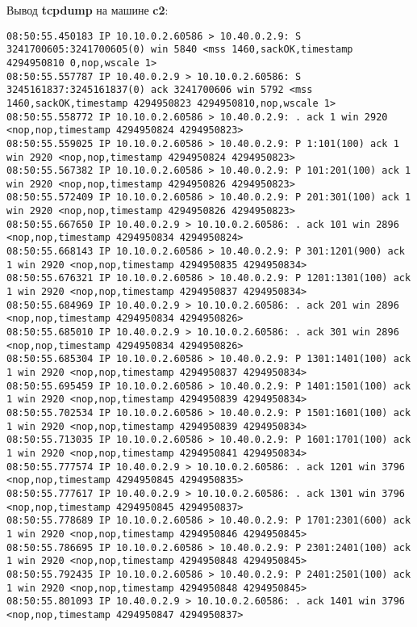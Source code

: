 \documentclass[a4paper,12pt]{article}
\begin{document}
Вывод \textbf{tcpdump} на машине \textbf{c2}:
\begin{Verbatim}
08:50:55.450183 IP 10.10.0.2.60586 > 10.40.0.2.9: S 3241700605:3241700605(0) win 5840 <mss 1460,sackOK,timestamp 4294950810 0,nop,wscale 1>
08:50:55.557787 IP 10.40.0.2.9 > 10.10.0.2.60586: S 3245161837:3245161837(0) ack 3241700606 win 5792 <mss 1460,sackOK,timestamp 4294950823 4294950810,nop,wscale 1>
08:50:55.558772 IP 10.10.0.2.60586 > 10.40.0.2.9: . ack 1 win 2920 <nop,nop,timestamp 4294950824 4294950823>
08:50:55.559025 IP 10.10.0.2.60586 > 10.40.0.2.9: P 1:101(100) ack 1 win 2920 <nop,nop,timestamp 4294950824 4294950823>
08:50:55.567382 IP 10.10.0.2.60586 > 10.40.0.2.9: P 101:201(100) ack 1 win 2920 <nop,nop,timestamp 4294950826 4294950823>
08:50:55.572409 IP 10.10.0.2.60586 > 10.40.0.2.9: P 201:301(100) ack 1 win 2920 <nop,nop,timestamp 4294950826 4294950823>
08:50:55.667650 IP 10.40.0.2.9 > 10.10.0.2.60586: . ack 101 win 2896 <nop,nop,timestamp 4294950834 4294950824>
08:50:55.668143 IP 10.10.0.2.60586 > 10.40.0.2.9: P 301:1201(900) ack 1 win 2920 <nop,nop,timestamp 4294950835 4294950834>
08:50:55.676321 IP 10.10.0.2.60586 > 10.40.0.2.9: P 1201:1301(100) ack 1 win 2920 <nop,nop,timestamp 4294950837 4294950834>
08:50:55.684969 IP 10.40.0.2.9 > 10.10.0.2.60586: . ack 201 win 2896 <nop,nop,timestamp 4294950834 4294950826>
08:50:55.685010 IP 10.40.0.2.9 > 10.10.0.2.60586: . ack 301 win 2896 <nop,nop,timestamp 4294950834 4294950826>
08:50:55.685304 IP 10.10.0.2.60586 > 10.40.0.2.9: P 1301:1401(100) ack 1 win 2920 <nop,nop,timestamp 4294950837 4294950834>
08:50:55.695459 IP 10.10.0.2.60586 > 10.40.0.2.9: P 1401:1501(100) ack 1 win 2920 <nop,nop,timestamp 4294950839 4294950834>
08:50:55.702534 IP 10.10.0.2.60586 > 10.40.0.2.9: P 1501:1601(100) ack 1 win 2920 <nop,nop,timestamp 4294950839 4294950834>
08:50:55.713035 IP 10.10.0.2.60586 > 10.40.0.2.9: P 1601:1701(100) ack 1 win 2920 <nop,nop,timestamp 4294950841 4294950834>
08:50:55.777574 IP 10.40.0.2.9 > 10.10.0.2.60586: . ack 1201 win 3796 <nop,nop,timestamp 4294950845 4294950835>
08:50:55.777617 IP 10.40.0.2.9 > 10.10.0.2.60586: . ack 1301 win 3796 <nop,nop,timestamp 4294950845 4294950837>
08:50:55.778689 IP 10.10.0.2.60586 > 10.40.0.2.9: P 1701:2301(600) ack 1 win 2920 <nop,nop,timestamp 4294950846 4294950845>
08:50:55.786695 IP 10.10.0.2.60586 > 10.40.0.2.9: P 2301:2401(100) ack 1 win 2920 <nop,nop,timestamp 4294950848 4294950845>
08:50:55.792435 IP 10.10.0.2.60586 > 10.40.0.2.9: P 2401:2501(100) ack 1 win 2920 <nop,nop,timestamp 4294950848 4294950845>
08:50:55.801093 IP 10.40.0.2.9 > 10.10.0.2.60586: . ack 1401 win 3796 <nop,nop,timestamp 4294950847 4294950837>

\end{Verbatim}
\end{document}
